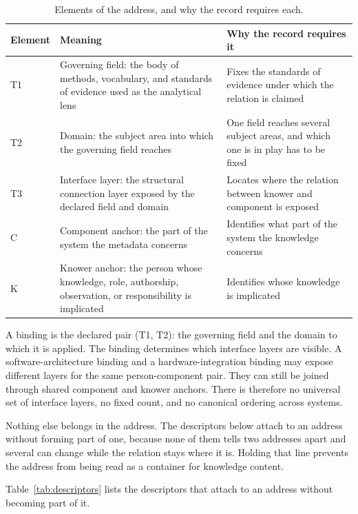 \documentclass[preprints,article,submit,moreauthors]{Definitions/mdpi}
\begin{document}
\begin{table}[H]
\caption{Elements of the address, and why the record requires each.}
\label{tab:address}
\centering
\scriptsize
\begin{tabularx}{\textwidth}{W{0.4}W{1.45}W{1.15}}
\hline
\textbf{Element} & \textbf{Meaning} & \textbf{Why the record requires it} \\
\hline
T1 & Governing field: the body of methods, vocabulary, and standards of evidence used as the analytical lens & Fixes the standards of evidence under which the relation is claimed \\
T2 & Domain: the subject area into which the governing field reaches & One field reaches several subject areas, and which one is in play has to be fixed \\
T3 & Interface layer: the structural connection layer exposed by the declared field and domain & Locates where the relation between knower and component is exposed \\
C & Component anchor: the part of the system the metadata concerns & Identifies what part of the system the knowledge concerns \\
K & Knower anchor: the person whose knowledge, role, authorship, observation, or responsibility is implicated & Identifies whose knowledge is implicated \\
\hline
\end{tabularx}
\end{table}

A binding is the declared pair (T1, T2): the governing field and the domain to which it is applied. The binding determines which interface layers are visible. A software-architecture binding and a hardware-integration binding may expose different layers for the same person-component pair. They can still be joined through shared component and knower anchors. There is therefore no universal set of interface layers, no fixed count, and no canonical ordering across systems.

Nothing else belongs in the address. The descriptors below attach to an address without forming part of one, because none of them tells two addresses apart and several can change while the relation stays where it is. Holding that line prevents the address from being read as a container for knowledge content.

Table~\ref{tab:descriptors} lists the descriptors that attach to an address without becoming part of it.
\end{document}
